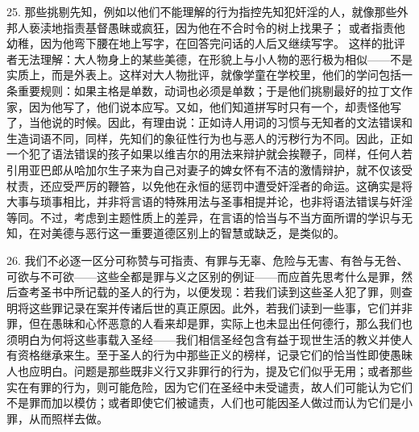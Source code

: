 25. 那些挑剔先知，例如以他们不能理解的行为指控先知犯奸淫的人，就像那些外邦人亵渎地指责基督愚昧或疯狂，因为他在不合时令的树上找果子； 或者指责他幼稚，因为他弯下腰在地上写字，在回答完问话的人后又继续写字。 这样的批评者无法理解：大人物身上的某些美德，在形貌上与小人物的恶行极为相似——不是实质上，而是外表上。这样对大人物批评，就像学童在学校里，他们的学问包括一条重要规则：如果主格是单数，动词也必须是单数；于是他们挑剔最好的拉丁文作家，因为他写了，他们说本应写。又如，他们知道拼写时只有一个，却责怪他写了，当他说的时候。因此，有理由说：正如诗人用词的习惯与无知者的文法错误和生造词语不同，同样，先知们的象征性行为也与恶人的污秽行为不同。因此，正如一个犯了语法错误的孩子如果以维吉尔的用法来辩护就会挨鞭子，同样，任何人若引用亚巴郎从哈加尔生子来为自己对妻子的婢女怀有不洁的激情辩护，就不仅该受杖责，还应受严厉的鞭笞，以免他在永恒的惩罚中遭受奸淫者的命运。这确实是将大事与琐事相比，并非将言语的特殊用法与圣事相提并论，也非将语法错误与奸淫等同。不过，考虑到主题性质上的差异，在言语的恰当与不当方面所谓的学识与无知，在对美德与恶行这一重要道德区别上的智慧或缺乏，是类似的。\par

26. 我们不必逐一区分可称赞与可指责、有罪与无辜、危险与无害、有咎与无咎、可欲与不可欲——这些全都是罪与义之区别的例证——而应首先思考什么是罪，然后查考圣书中所记载的圣人的行为，以便发现：若我们读到这些圣人犯了罪，则查明将这些罪记录在案并传诸后世的真正原因。此外，若我们读到一些事，它们并非罪，但在愚昧和心怀恶意的人看来却是罪，实际上也未显出任何德行，那么我们也须明白为何将这些事载入圣经——我们相信圣经包含有益于现世生活的教义并使人有资格继承来生。至于圣人的行为中那些正义的榜样，记录它们的恰当性即使愚昧人也应明白。问题是那些既非义行又非罪行的行为，提及它们似乎无用；或者那些实在有罪的行为，则可能危险，因为它们在圣经中未受谴责，故人们可能认为它们不是罪而加以模仿；或者即使它们被谴责，人们也可能因圣人做过而认为它们是小罪，从而照样去做。\par

